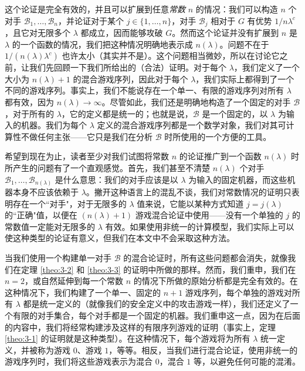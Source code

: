 这个论证是完全有效的，并且可以扩展到任意\emph{常数} $n$ 的情况：我们可以构造 $n$ 个对手 $\mathcal{B}_1,\dots,\mathcal{B}_n$，并论证对于某个 $j\in\{1,\dots,n\}$，对手 $\mathcal{B}_j$ 相对于 $G$ 有优势 $1/n\lambda^c$，且它对无限多个 $\lambda$ 都成立，因而能够攻破 $G$。然而这个论证并没有扩展到 $n$ 是 $\lambda$ 的一个函数的情况，我们把这种情况明确地表示成 $n(\lambda)$。问题不在于 $1/(n(\lambda)\lambda^c)$ 也许太小（其实并不是）。这个问题相当微妙，所以在讨论它之前，让我们先回顾一下我们所给出的（合法）证明。对于每个 $\lambda$，我们定义了一个大小为 $n(\lambda)+1$ 的混合游戏序列，因此对于每个 $\lambda$，我们实际上都得到了一个不同的游戏序列。事实上，我们不能说存在一个单一、有限的游戏序列对所有 $\lambda$ 都有效，因为 $n(\lambda)\to\infty$。尽管如此，我们还是明确地构造了一个固定的对手 $\mathcal B$，对于所有的 $\lambda$，它的定义都是统一的；也就是说，$\mathcal B$ 是一个固定的，以 $\lambda$ 为输入的机器。我们为每个 $\lambda$ 定义的混合游戏序列都是一个数学对象，我们对其可计算性不做任何主张——它只是我们在分析 $\mathcal B$ 时所使用的一个方便的工具。

希望到现在为止，读者至少对我们试图将常数 $n$ 的论证推广到一个函数 $n(\lambda)$ 时所产生的问题有了一个直观感觉。首先，我们甚至不清楚 $n(\lambda)$ 个对手 $\mathcal{B}_1,\dots,\mathcal{B}_{n(\lambda)}$ 是什么意思：我们的对手应该是以 $\lambda$ 为输入的固定机器，而这些机器本身不应该依赖于 $\lambda$。撇开这种语言上的混乱不谈，我们对常数情况的证明只表明存在一个``对手"，对于无限多的 $\lambda$ 值来说，它能以某种方式知道 $j=j(\lambda)$ 的``正确"值，以便在 $(n(\lambda)+1)$ 游戏混合论证中使用——没有一个单独的 $j$ 的常数值一定能对无限多的 $\lambda$ 有效。如果使用非统一的计算模型，我们实际上可以使这种类型的论证有意义，但我们在本文中不会采取这种方法。

当我们使用一个构建单一对手 $\mathcal B$ 的混合论证时，所有这些问题都会消失，就像我们在定理 \ref{theo:3-2} 和 \ref{theo:3-3} 的证明中所做的那样。然而，我们重申，我们在 $n=2$，或自然延伸到每一个常数 $n$ 的情况下所做的原始分析都是完全有效的。在这种情况下，我们构建了一个单一、固定的 $n+1$ 游戏序列，每个单独的游戏对所有 $\lambda$ 都是统一定义的（就像我们的安全定义中的攻击游戏一样），我们还定义了一个有限的对手集合，每个对手都是一个固定的机器。我们重申这一点，因为在后面的内容中，我们将经常构建涉及这样的有限序列游戏的证明（事实上，定理 \ref{theo:3-1} 的证明就是这种类型）。在这种情况下，每个游戏将为所有 $\lambda$ 统一定义，并被称为游戏 $0$、游戏 $1$，等等。相反，当我们进行混合论证，使用非统一的游戏序列时，我们将这些游戏表示为混合 $0$，混合 $1$ 等，以避免任何可能的混淆。
